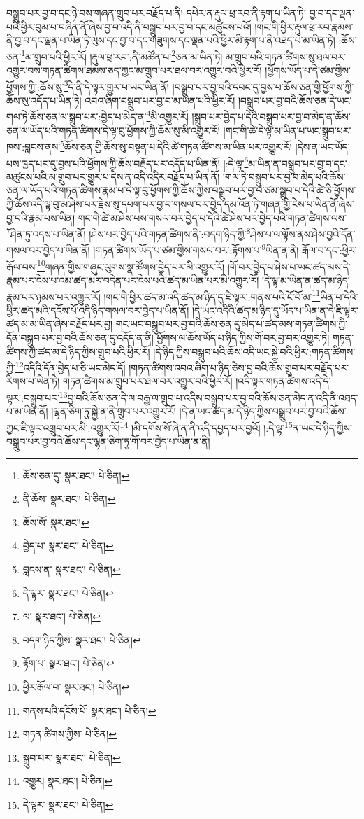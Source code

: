 བསྒྲུབ་པར་བྱ་བ་དང་ཉེ་བས་གཞན་གྲུབ་པར་བརྗོད་པ་ནི། དཔེར་ན་རྡུལ་ཕྲ་རབ་ནི་རྟག་པ་ཡིན་ཏེ། བྱ་བ་དང་ལྡན་པའི་ཕྱིར་བུམ་པ་བཞིན་ནོ་ཞེས་བྱ་བ་འདི་ནི་བསྒྲུབ་པར་བྱ་བ་དང་མཚུངས་པའོ། །གང་གི་ཕྱིར་རྡུལ་ཕྲ་རབ་རྣམས་ནི་བྱ་བ་དང་ལྡན་པ་ཡིན་ཏེ་ལུས་དང་བྱ་བ་དང་གཟུགས་དང་ལྡན་པའི་ཕྱིར་མི་རྟག་པ་ནི་འཐད་པ་མ་ཡིན་ཏེ། :ཆོས་ཅན་\footnote{ཆོས་ཅན་དུ་  སྣར་ཐང་།  པེ་ཅིན། }མ་གྲུབ་པའི་ཕྱིར་རོ། །རྡུལ་ཕྲ་རབ་:ནི་མཚོན་པ་\footnote{ནི་ཆོས་  སྣར་ཐང་།  པེ་ཅིན། }ཅན་མ་ཡིན་ཏེ། མ་གྲུབ་པའི་གཏན་ཚིགས་སུ་ཐལ་བར་འགྱུར་བས་གཏན་ཚིགས་ཐམས་ཅད་ཀྱང་མ་གྲུབ་པར་ཐལ་བར་འགྱུར་བའི་ཕྱིར་རོ། །ཕྱོགས་ཡོད་པ་དེ་ཙམ་གྱིས་ཕྱོགས་ཀྱི་:ཆོས་སུ་\footnote{ཆོས་སོ་  སྣར་ཐང་། }དེ་ནི་དེ་ལྟར་གྱུར་པ་ཡང་ཡིན་ནོ། །བསྒྲུབ་པར་བྱ་བའི་དབང་དུ་བྱས་པ་ཆོས་ཅན་གྱི་ཕྱོགས་ཀྱི་ཆོས་སུ་འདོད་པ་ཡིན་ཏེ། འབའ་ཞིག་བསྒྲུབ་པར་བྱ་བ་མ་ཡིན་པའི་ཕྱིར་རོ། །བསྒྲུབ་པར་བྱ་བའི་ཆོས་ཅན་དེ་ཡང་གལ་ཏེ་ཆོས་ཅན་ལ་སྒྲུབ་པར་:བྱེད་པ་མེད་ན་\footnote{བྱེད་པ་  སྣར་ཐང་།  པེ་ཅིན། }མི་འགྱུར་རོ། །སྒྲུབ་པར་བྱེད་པ་དེའི་བསྒྲུབ་པར་བྱ་བ་མེད་ན་ཆོས་ཅན་ལ་ཡོད་པའི་གཏན་ཚིགས་དེ་ལྟ་བུ་ཕྱོགས་ཀྱི་ཆོས་སུ་མི་འགྱུར་རོ། །གང་གི་ཚེ་དེ་ལྟ་མ་ཡིན་པ་ཡང་སྒྲུབ་པར་ཁས་:བླངས་ནས་\footnote{བླངས་ན་  སྣར་ཐང་།  པེ་ཅིན། }ཆོས་ཅན་གྱི་ཆོས་སུ་བསྟན་པ་དེའི་ཚེ་གཏན་ཚིགས་མ་ཡིན་པར་འགྱུར་རོ། །དེས་ན་ཡང་ཡོད་པས་ཁྱད་པར་དུ་བྱས་པའི་ཕྱོགས་ཀྱི་ཆོས་བརྗོད་པར་འདོད་པ་ཡིན་ནོ། །:དེ་ལྟ་\footnote{དེ་ལྟར་  སྣར་ཐང་།  པེ་ཅིན། }མ་ཡིན་ན་བསྒྲུབ་པར་བྱ་བ་དང་མཚུངས་པའི་མ་གྲུབ་པར་གྱུར་པ་དེས་ན་འདི་འདིར་བརྗོད་པ་ཡིན་ནོ། །གལ་ཏེ་བསྒྲུབ་པར་བྱ་བ་མེད་པའི་ཆོས་ཅན་ལ་ཡོད་པའི་གཏན་ཚིགས་རྣམ་པ་དེ་ལྟ་བུ་ཕྱོགས་ཀྱི་ཆོས་ཀྱིས་བསྒྲུབ་པར་བྱ་བ་ཙམ་སྒྲུབ་པ་དེའི་ཚེ་ཅི་ཕྱོགས་ཀྱི་ཆོས་འདི་ལྟ་བུ་མ་ཤེས་པར་རྗེས་སུ་དཔག་པར་བྱ་བ་གསལ་བར་བྱེད་དམ་འོན་ཏེ་གཞན་གྱི་ངེས་པ་ཡིན་ནོ་ཞེས་བྱ་བའི་རྣམ་པས་ཡིན། གང་གི་ཚེ་མ་ཤེས་པས་གསལ་བར་བྱེད་པ་དེའི་ཚེ་ཤེས་པར་བྱེད་པའི་གཏན་ཚིགས་ལས་\footnote{ལ་  སྣར་ཐང་།  པེ་ཅིན། }ཤིན་ཏུ་འདས་པ་ཡིན་ནོ། །ཤེས་པར་བྱེད་པའི་གཏན་ཚིགས་ནི་:བདག་ཉིད་ཀྱི་\footnote{བདག་ཉིད་ཀྱིས་  སྣར་ཐང་།  པེ་ཅིན། }ཤེས་པ་ལ་ལྟོས་ནས་ཤེས་བྱའི་དོན་གསལ་བར་བྱེད་པ་ཡིན་ནོ། །གཏན་ཚིགས་ཡོད་པ་ཙམ་གྱིས་གསལ་བར་:རྟོགས་པ་\footnote{རྟོག་པ་  སྣར་ཐང་།  པེ་ཅིན། }ཡིན་ན་ནི། རྒོལ་བ་དང་:ཕྱིར་རྒོལ་བས་\footnote{ཕྱིར་རྒོལ་བ་  སྣར་ཐང་།  པེ་ཅིན། }གཞན་གྱིས་གཞུང་ལུགས་སྣ་ཚོགས་བྱེད་པར་མི་འགྱུར་རོ། །གོ་བར་བྱེད་པ་ཤེས་པ་ཡང་ཚད་མས་དེ་རྣམ་པར་ངེས་པ་འམ་ཚད་མར་བདེན་པར་ངེས་པའི་ཚད་མ་ཡིན་པར་མི་འགྱུར་རོ། །དེ་ལྟ་མ་ཡིན་ན་ཚད་མ་ཉིད་རྣམ་པར་ཉམས་པར་འགྱུར་རོ། །གང་གི་ཕྱིར་ཚད་མ་འདི་ཚད་མ་ཉིད་དུ་ཇི་ལྟར་:གནས་པའི་ངོ་བོ་མ་\footnote{གནས་པའི་དངོས་པོ་  སྣར་ཐང་།  པེ་ཅིན། }ཡིན་པ་དེའི་ཕྱིར་ཚད་མའི་དངོས་པོ་འདི་ཉིད་གསལ་བར་བྱེད་པ་ཡིན་ནོ། །དེ་ཡང་འདིའི་ཚད་མ་ཉིད་དུ་ཡོད་པ་ཡིན་ན་དེ་ཇི་ལྟར་ཚད་མ་མ་ཡིན་ཞེས་བརྗོད་པར་བྱ། གང་ཡང་བསྒྲུབ་པར་བྱ་བའི་ཆོས་ཅན་དུ་མེད་པ་ཚད་མས་གཏན་ཚིགས་ཀྱི་དོན་བསྒྲུབ་པར་བྱ་བའི་ཆོས་ཅན་དུ་འདོད་ན་ནི། ཕྱོགས་ལ་ཆོས་ཡོད་པ་ཉིད་ཀྱིས་གོ་བར་བྱ་བར་འགྱུར་ཏེ། གཏན་ཚིགས་ཀྱི་ཚད་མ་དེ་ཉིད་ཀྱིས་གྲུབ་པའི་ཕྱིར་རོ། །དེ་ཉིད་ཀྱིས་བསྒྲུབ་པའི་ཆོས་འདི་ཡང་སྐྱེ་བའི་ཕྱིར་:གཏན་ཚིགས་ཀྱི་\footnote{གཏན་ཚིགས་ཀྱིས་  པེ་ཅིན། }འདིའི་དོན་བྱེད་པ་ཅི་ཡང་མེད་དོ། །གཏན་ཚིགས་འབའ་ཞིག་པ་ཉིད་ཅེས་བྱ་བའི་ཆོས་གྲུབ་པར་བརྗོད་པར་རིགས་པ་ཡིན་ཏེ། གཏན་ཚིགས་མ་གྲུབ་པར་ཐལ་བར་འགྱུར་བའི་ཕྱིར་རོ། །འདི་ལྟར་གཏན་ཚིགས་འདི་དེ་ལྟར་:བསྒྲུབ་པར་\footnote{སྒྲུབ་པར་  སྣར་ཐང་།  པེ་ཅིན། }བྱ་བའི་ཆོས་ཅན་དེ་ལ་བརྒྱ་ལ་གྲུབ་པ་འདིས་བསྒྲུབ་པར་བྱ་བའི་ཆོས་ཅན་མེད་ན་འདི་ནི་འཐད་པ་མ་ཡིན་ནོ། །ལྷན་ཅིག་ཏུ་སྐྱེ་ན་ནི་གྲུབ་པར་འགྱུར་རོ། །དེ་ན་ཡང་ཚད་མ་དེ་ཉིད་ཀྱིས་བསྒྲུབ་པར་བྱ་བའི་ཆོས་ཀྱང་ཇི་ལྟར་འགྲུབ་པར་མི་:འགྱུར་རོ།\footnote{འགྱུར།  སྣར་ཐང་།  པེ་ཅིན། } །མི་དགོས་སོ་ཞེ་ན་ནི་འདི་དཔྱད་པར་བྱའོ། །:དེ་ལྟ་\footnote{དེ་ལྟར་  སྣར་ཐང་།  པེ་ཅིན། }ན་ཡང་དེ་ཉིད་ཀྱིས་བསྒྲུབ་པར་བྱ་བའི་ཆོས་དང་ལྷན་ཅིག་ཏུ་གོ་བར་བྱེད་པ་ཡིན་ན་ནི། 